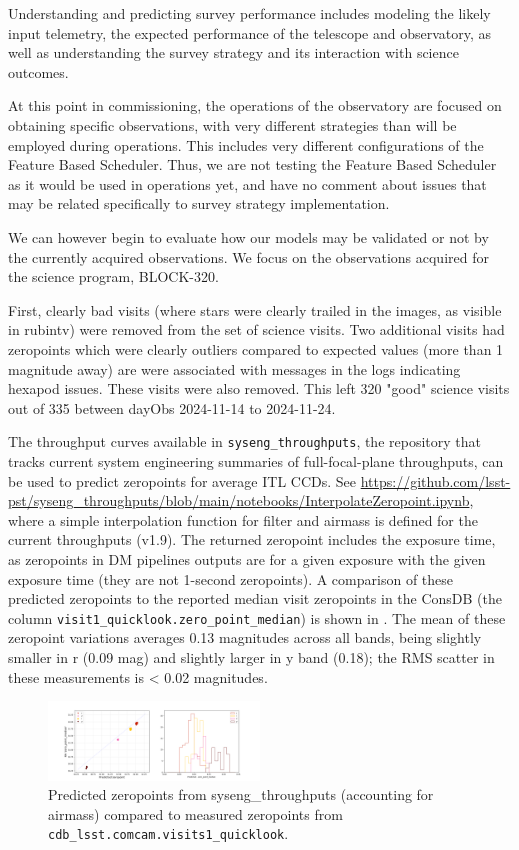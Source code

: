 Understanding and predicting survey performance includes modeling the likely input telemetry, the expected performance of the telescope and observatory, as well as understanding the survey strategy and its interaction with science outcomes.

At this point in commissioning, the operations of the observatory are focused on obtaining specific observations, with very different strategies than will be employed during operations. This includes very different configurations of the Feature Based Scheduler. Thus, we are not testing the Feature Based Scheduler as it would be used in operations yet, and have no comment about issues that may be related specifically to survey strategy implementation.

We can however begin to evaluate how our models may be validated or not by the currently acquired observations. We focus on the observations acquired for the science program, BLOCK-320.

First, clearly bad visits (where stars were clearly trailed in the images, as visible in rubintv) were removed from the set of science visits. Two additional visits had zeropoints which were clearly outliers compared to expected values (more than 1 magnitude away) are were associated with messages in the logs indicating hexapod issues. These visits were also removed. This left 320 "good" science visits out of 335 between dayObs 2024-11-14 to 2024-11-24.

The throughput curves available in \texttt{syseng\_throughputs}, the repository that tracks current system engineering summaries of full-focal-plane throughputs, can be used to predict zeropoints for average ITL CCDs. See \url{https://github.com/lsst-pst/syseng\_throughputs/blob/main/notebooks/InterpolateZeropoint.ipynb}, where a simple interpolation function for filter and airmass is defined for the current throughputs (v1.9). The returned zeropoint includes the exposure time, as zeropoints in DM pipelines outputs are for a given exposure with the given exposure time (they are not 1-second zeropoints). A comparison of these predicted zeropoints to the reported median visit zeropoints in the ConsDB (the column \texttt{visit1\_quicklook.zero\_point\_median}) is shown in . The mean of these zeropoint variations averages 0.13 magnitudes across all bands, being slightly smaller in r (0.09 mag) and slightly larger in y band (0.18); the RMS scatter in these measurements is < 0.02 magnitudes.


\begin{figure}
    \centering
    \includegraphics[width=0.5\textwidth]{sp/zeropoints.png}
    \caption{Predicted zeropoints from syseng\_throughputs (accounting for airmass) compared to measured zeropoints from \texttt{cdb\_lsst.comcam.visits1\_quicklook}.}
    \label{fig:zeropoints}
    \end{figure}



